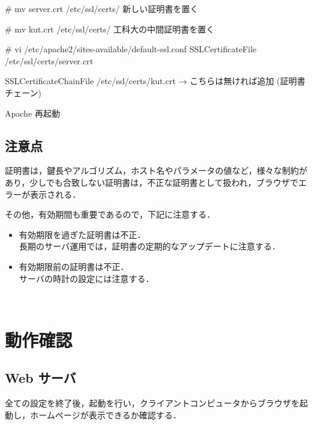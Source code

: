 \begin{cli}
# mv server.crt /etc/ssl/certs/
 新しい証明書を置く

# mv kut.crt /etc/ssl/certs/
 工科大の中間証明書を置く

# vi /etc/apache2/sites-available/default-ssl.conf
SSLCertificateFile      /etc/ssl/certs/server.crt

SSLCertificateChainFile /etc/ssl/certs/kut.crt
→ こちらは無ければ追加 (証明書チェーン)

Apache 再起動

\end{cli}

\subsection{注意点}

証明書は，鍵長やアルゴリズム，ホスト名やパラメータの値など，様々な制約が
あり，少しでも合致しない証明書は，不正な証明書として扱われ，ブラウザでエ
ラーが表示される．

その他，有効期間も重要であるので，下記に注意する．

\begin{itemize}
    \item 有効期限を過ぎた証明書は不正．\\
    長期のサーバ運用では，証明書の定期的なアップデートに注意する．
    \item 有効期限前の証明書は不正．\\
    サーバの時計の設定には注意する．
\end{itemize}　



\section{動作確認}

\subsection*{Web サーバ}

全ての設定を終了後，起動を行い，クライアントコンピュータからブラウザを起
動し，ホームページが表示できるか確認する．

